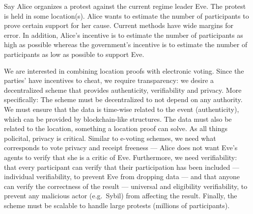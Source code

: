 Say Alice organizes a protest against the current regime leader Eve.
The protest is held in some location(s).
Alice wants to estimate the number of participants to prove certain support for
her cause.
Current methods have wide margins for error.
In addition, Alice's incentive is to estimate the number of participants as 
high as possible whereas the government's incentive is to estimate the number 
of participants as low as possible to support Eve.

We are interested in combining location proofs with electronic voting.
Since the parties' have incentives to cheat, we require transparency: we desire 
a decentralized scheme that provides authenticity, verifiability and privacy.
More specifically:
The scheme must be decentralized to not depend on any authority.
We must ensure that the data is time-wise related to the event (authenticity), 
which can be provided by blockchain-like structures.
The data must also be related to the location, something a location proof can 
solve.
As all things policital, privacy is critical.
Similar to e-voting schemes, we need what corresponds to vote privacy and 
receipt freeness --- Alice does not want Eve's agents to verify that she is a 
critic of Eve.
Furthermore, we need verifiability: that every participant can verify that 
their participation has been included --- individual verifiability, to prevent 
Eve from dropping data --- and that anyone can verify the correctness of the 
result --- universal and eligibility verifiability, to prevent any malicious 
actor (e.g.\ Sybil) from affecting the result.
Finally, the scheme must be scalable to handle large protests (millions of 
participants).

